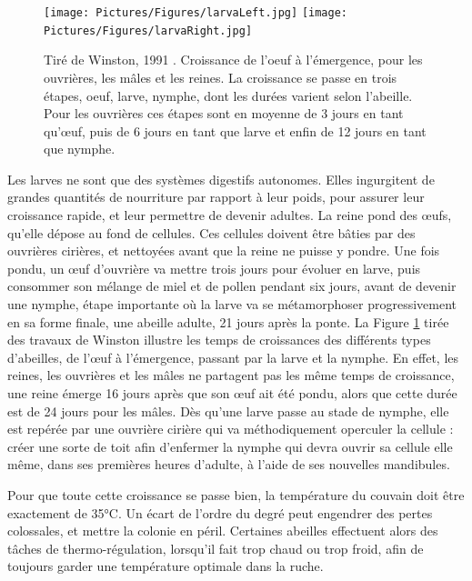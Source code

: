 			\begin{figure}
			\centering
			\texttt{[image: Pictures/Figures/larvaLeft.jpg]}
			\texttt{[image: Pictures/Figures/larvaRight.jpg]}
			\caption[Tirée de Winston, 1991 \cite{winston_biology_1991}. Croissance de l'oeuf à l'émergence, pour les ouvrières, les mâles et les reines.]{Tiré de Winston, 1991 \cite{winston_biology_1991}. Croissance de l'oeuf à l'émergence, pour les ouvrières, les mâles et les reines. La croissance se passe en trois étapes, oeuf, larve, nymphe, dont les durées varient selon l'abeille. Pour les ouvrières ces étapes sont en moyenne de 3 jours en tant qu'œuf, puis de 6 jours en tant que larve et enfin de 12 jours en tant que nymphe.}
			\label{LarvaDev}
			\end{figure}
			
			Les larves ne sont que des systèmes digestifs autonomes. Elles ingurgitent de grandes quantités de nourriture par rapport à leur poids, pour assurer leur croissance rapide, et leur permettre de devenir adultes. La reine pond des œufs, qu'elle dépose au fond de cellules. Ces cellules doivent être bâties par des ouvrières cirières, et nettoyées avant que la reine ne puisse y pondre. Une fois pondu, un œuf d'ouvrière va mettre trois jours pour évoluer en larve, puis consommer son mélange de miel et de pollen pendant six jours, avant de devenir une nymphe, étape importante où la larve va se métamorphoser progressivement en sa forme finale, une abeille adulte, 21 jours après la ponte. La Figure \ref{LarvaDev} tirée des travaux de Winston \cite{winston_biology_1991} illustre les temps de croissances des différents types d'abeilles, de l'œuf à l'émergence, passant par la larve et la nymphe. En effet, les reines, les ouvrières et les mâles ne partagent pas les même temps de croissance, une reine émerge 16 jours après que son œuf ait été pondu, alors que cette durée est de 24 jours pour les mâles. Dès qu'une larve passe au stade de nymphe, elle est repérée par une ouvrière cirière qui va méthodiquement operculer la cellule : créer une sorte de toit afin d'enfermer la nymphe qui devra ouvrir sa cellule elle même, dans ses premières heures d'adulte, à l'aide de ses nouvelles mandibules.
			
			Pour que toute cette croissance se passe bien, la température du couvain doit être exactement de 35°C. Un écart de l'ordre du degré peut engendrer des pertes colossales, et mettre la colonie en péril. Certaines abeilles effectuent alors des tâches de thermo-régulation, lorsqu'il fait trop chaud ou trop froid, afin de toujours garder une température optimale dans la ruche.

